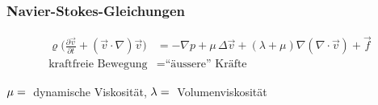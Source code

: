 %
%
%
\bgroup
\begin{frame}
\setlength{\abovedisplayskip}{5pt}
\setlength{\belowdisplayskip}{5pt}
\frametitle{Navier-Stokes-Gleichungen}
\begin{align*}
\varrho
\biggl(
\frac{\partial\vec{v}}{\partial t}
+
(\vec{v}\cdot\nabla)\vec{v}
\biggr)
&=
-\nabla p
+\mu\,\Delta\vec{v}
+
(\lambda+\mu)\nabla(\nabla\cdot\vec{v})+\vec{f}
\\
\text{kraftfreie Bewegung}
&=
\text{``äussere'' Kräfte}
\end{align*}
\bigskip

$\mu=\mathstrut$ dynamische Viskosität,
$\lambda=\mathstrut$ Volumenviskosität
\end{frame}
\egroup
